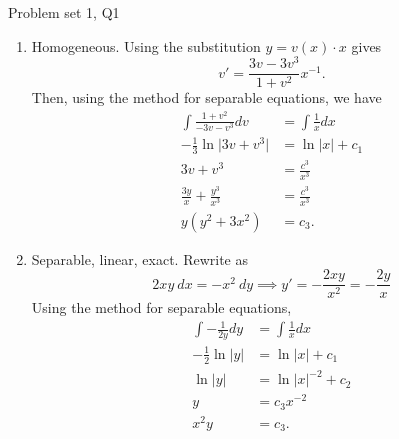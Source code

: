 \begin{problem}{Problem set 1, Q1}{}
\begin{enumerate}
\begin{align*}
                &= \frac{2(x^2 + 2x + 1) - 2}{(x+1)^3}
                    + \frac{c_5}{(x+1)^3} \\
                &= \frac{2}{x + 1} + \frac{c_6}{(x+1)^3} .
            \end{align*}
        \item Homogeneous. Using the substitution $y = v(x) \cdot x$ gives
            $$ v' = \frac{3v - 3v^3}{1 + v^2} x^{-1} . $$
        Then, using the method for separable equations, we have
            \begin{align*}
                \int \frac{1 + v^2}{-3v - v^3} dv
                    &= \int \frac{1}{x} dx \\
                -\frac{1}{3} \ln \lvert 3v + v^3 \rvert
                    &= \ln \lvert x \rvert + c_1 \\
                3v + v^3 &= \frac{c^3}{x^3} \\
                \frac{3y}{x} + \frac{y^3}{x^3} &= \frac{c^3}{x^3} \\
                y(y^2 + 3x^2) &= c_3 .
            \end{align*}
        \item Separable, linear, exact. Rewrite as
            $$ 2xy \ dx = -x^2 \ dy \implies y' = -\frac{2xy}{x^2}
                = -\frac{2y}{x} $$
        Using the method for separable equations,
            \begin{align*}
                \int -\frac{1}{2y} dy &= \int \frac{1}{x} dx \\
                -\frac{1}{2} \ln \lvert y \rvert
                    &= \ln \lvert x \rvert + c_1 \\
                \ln \lvert y \rvert &= \ln \lvert x \rvert^{-2} + c_2 \\
                y &= c_3 x^{-2} \\
                x^2 y &= c_3 .
            \end{align*}
    \end{enumerate}
    
\end{problem}

